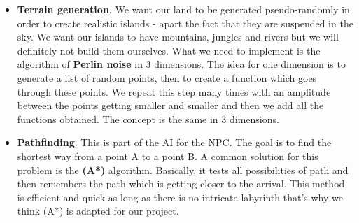 \documentclass[article]{report}
\begin{document}
						\begin{itemize}
\renewcommand{\labelitemi}{$\bullet$}
\item \textbf{Terrain generation}. We want our land to be generated pseudo-randomly in order to create realistic islands - apart the fact that they are suspended in the sky. We want our islands to have mountains, jungles and rivers but we will definitely not build them ourselves. What we need to implement is the algorithm of \textbf{Perlin noise} in 3 dimensions. The idea for one dimension is to generate a list of random points, then to create a function which goes through these points. We repeat this step many times with an amplitude between the points getting smaller and smaller and then we add all the functions obtained. The concept is the same in 3 dimensions.\\

\item \textbf{Pathfinding}. This is part of the \ac{AI} for the \ac{NPC}. The goal is to find the shortest way from a point A to a point B. A common solution for this problem is the \textbf{(A*)} algorithm. Basically, it tests all possibilities of path and then remembers the path which is getting closer to the arrival. This method is efficient and quick as long as there is no intricate labyrinth that’s why we think (A*) is adapted for our project.
\end{itemize}

\begin{acronym}
\end{acronym}
     		
\end{document}

